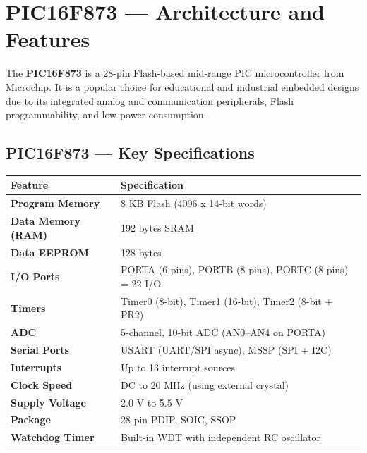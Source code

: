 \documentclass[12pt,a4paper]{article}
\renewcommand{\arraystretch}{1.45}
\begin{document}
\section{PIC16F873 --- Architecture and Features}

\begin{tcolorbox}[defbox, title={\textbf{PIC16F873}}]
The \textbf{PIC16F873} is a 28-pin Flash-based mid-range PIC microcontroller from Microchip. It is a popular choice for educational and industrial embedded designs due to its integrated analog and communication peripherals, Flash programmability, and low power consumption.
\end{tcolorbox}

\subsection{PIC16F873 --- Key Specifications}

\par\noindent
{\renewcommand{\arraystretch}{1.55}%
\begin{tabularx}{\linewidth}{|B{3.5cm}|Y|}
\hline
\textbf{Feature} & \textbf{Specification} \\
\hline
\textbf{Program Memory} & 8 KB Flash (4096 x 14-bit words) \\
\hline
\textbf{Data Memory (RAM)} & 192 bytes SRAM \\
\hline
\textbf{Data EEPROM} & 128 bytes \\
\hline
\textbf{I/O Ports} & PORTA (6 pins), PORTB (8 pins), PORTC (8 pins) = 22 I/O \\
\hline
\textbf{Timers} & Timer0 (8-bit), Timer1 (16-bit), Timer2 (8-bit + PR2) \\
\hline
\textbf{ADC} & 5-channel, 10-bit ADC (AN0--AN4 on PORTA) \\
\hline
\textbf{Serial Ports} & USART (UART/SPI async), MSSP (SPI + I2C) \\
\hline
\textbf{Interrupts} & Up to 13 interrupt sources \\
\hline
\textbf{Clock Speed} & DC to 20 MHz (using external crystal) \\
\hline
\textbf{Supply Voltage} & 2.0 V to 5.5 V \\
\hline
\textbf{Package} & 28-pin PDIP, SOIC, SSOP \\
\hline
\textbf{Watchdog Timer} & Built-in WDT with independent RC oscillator \\
\hline
\end{tabularx}}
\end{document}

